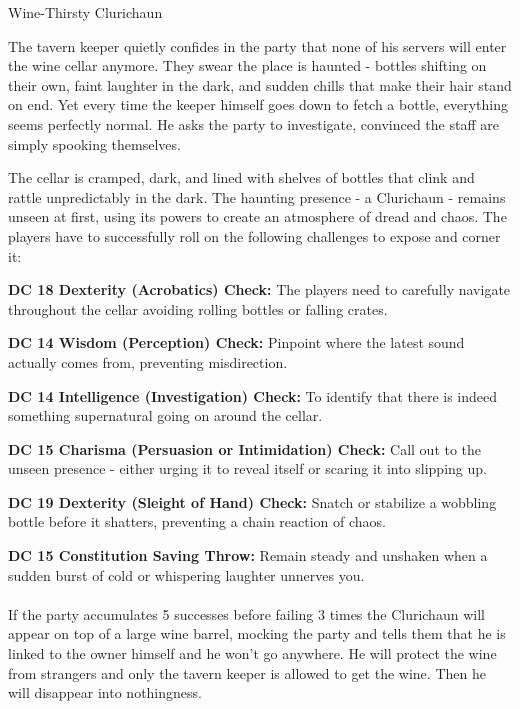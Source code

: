 \begin{DndQuestHook}[width=0.5\textwidth - 4pt]{Wine-Thirsty Clurichaun}
	\DndQuestHookBasics[%
		location = {The Golden Feather Tavern - Crail},%
		quest-giver = {Tavern Keeper},%
		objective = {Find out what is causing the disturbance in the wine cellar}%
	]%
	
	{\noindent\entryfont The tavern keeper quietly confides in the party that none of his servers will enter the wine cellar anymore. They swear the place is haunted - bottles shifting on their own, faint laughter in the dark, and sudden chills that make their hair stand on end. Yet every time the keeper himself goes down to fetch a bottle, everything seems perfectly normal. He asks the party to investigate, convinced the staff are simply spooking themselves.
	
	The cellar is cramped, dark, and lined with shelves of bottles that clink and rattle unpredictably in the dark. The haunting presence - a Clurichaun - remains unseen at first, using its powers to create an atmosphere of dread and chaos. The players have to successfully roll on the following challenges to expose and corner it:
	
	\textbf{DC 18 Dexterity (Acrobatics) Check:} The players need to carefully navigate throughout the cellar avoiding rolling bottles or falling crates.
	
	\textbf{DC 14 Wisdom (Perception) Check:} Pinpoint where the latest sound actually comes from, preventing misdirection.
	
	\textbf{DC 14 Intelligence (Investigation) Check:} To identify that there is indeed something supernatural going on around the cellar.
	
	\textbf{DC 15 Charisma (Persuasion or Intimidation) Check:} Call out to the unseen presence - either urging it to reveal itself or scaring it into slipping up.
	
	\textbf{DC 19 Dexterity (Sleight of Hand) Check:} Snatch or stabilize a wobbling bottle before it shatters, preventing a chain reaction of chaos.
	
	\textbf{DC 15 Constitution Saving Throw:} Remain steady and unshaken when a sudden burst of cold or whispering laughter unnerves you.\\\\
	If the party accumulates 5 successes before failing 3 times the Clurichaun will appear on top of a large wine barrel, mocking the party and tells them that he is linked to the owner himself and he won't go anywhere. He will protect the wine from strangers and only the tavern keeper is allowed to get the wine. Then he will disappear into nothingness.
	
}
\end{DndQuestHook}
